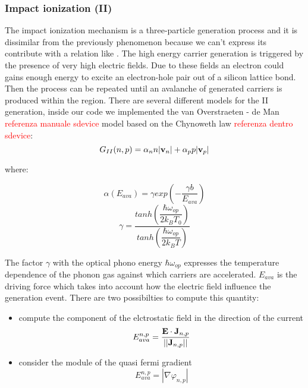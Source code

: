\subsubsection{Impact ionization (II)}

The impact ionization mechanism is a three-particle generation  process and it is dissimilar from the previously phenomenon because we can't express its contribute with a relation like . The high energy carrier generation is triggered by the presence of very high electric fields. Due to these fields an electron could gains enough energy to excite an electron-hole pair out of a silicon lattice bond. Then the process can be repeated until an avalanche of generated carriers is produced within the region.
There are several different models for the II generation, inside our code we implemented the van Overstraeten - de Man \textcolor{red}{referenza manuale sdevice} model based on the Chynoweth law \textcolor{red}{referenza dentro sdevice}:
\begin{equation}
G_{II}(n,p)= \alpha_n n |\mathbf{v}_n| + \alpha_p p |\mathbf{v}_p|
\end{equation}

where:

\begin{equation}
\alpha(E_{ava}) = \gamma exp\left(-\dfrac{\gamma b}{E_{ava}} \right)
\end{equation} 
\begin{equation}
\gamma = \dfrac{tanh\left(\dfrac{\hbar \omega_{op}}{2k_BT_0} \right) }{tanh\left(\dfrac{\hbar \omega_{op}}{2k_BT} \right)}
\end{equation}

The factor $\gamma$ with the optical phono energy $\hbar \omega_{op}$ expresses the temperature dependence of the phonon gas against which carriers are accelerated.
$E_{ava}$ is the driving force which takes into account how the electric field influence the generation event. There are two possibilties to compute this quantity:
\begin{itemize}
\item compute the component of the elctrostatic field in the direction of the current
\begin{equation}
E_{ava}^{n,p} = \dfrac{\mathbf{E}\cdot\mathbf{J}_{n,p}}{||\mathbf{J}_{n,p}||}
\end{equation}
\item consider the module of the quasi fermi gradient
\begin{equation}
E_{ava}^{n,p} = |\nabla \varphi_{n,p}|
\end{equation}
\end{itemize}

